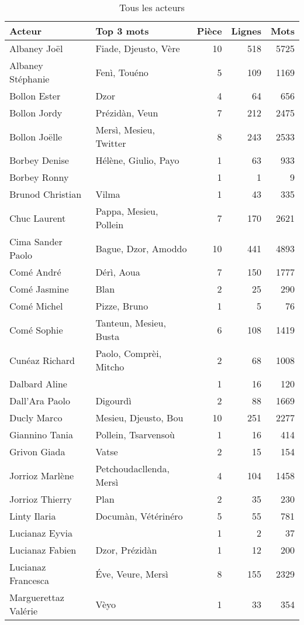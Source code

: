 \begin{longtable}{llrrr}
\caption{Tous les acteurs}\\
\toprule
\textbf{Acteur} & \textbf{Top 3 mots} & \textbf{Pièce} & \textbf{Lignes} & \textbf{Mots} \\
    \hline
Albaney Joël &Fiade, Djeusto, Vère & 10 & 518 & 5725\\
Albaney Stéphanie &Fenì, Touéno & 5 & 109 & 1169\\
Bollon Ester &Dzor & 4 & 64 & 656\\
Bollon Jordy &Prézidàn, Veun & 7 & 212 & 2475\\
Bollon Joëlle &Mersì, Mesieu, Twitter & 8 & 243 & 2533\\
Borbey Denise &Hélène, Giulio, Payo & 1 & 63 & 933\\
Borbey Ronny & & 1 & 1 & 9\\
Brunod Christian &Vilma & 1 & 43 & 335\\
Chuc Laurent &Pappa, Mesieu, Pollein & 7 & 170 & 2621\\
Cima Sander Paolo &Bague, Dzor, Amoddo & 10 & 441 & 4893\\
Comé André &Dérì, Aoua & 7 & 150 & 1777\\
Comé Jasmine &Blan & 2 & 25 & 290\\
Comé Michel &Pizze, Bruno & 1 & 5 & 76\\
Comé Sophie &Tanteun, Mesieu, Busta & 6 & 108 & 1419\\
Cunéaz Richard &Paolo, Comprèi, Mitcho & 2 & 68 & 1008\\
Dalbard Aline & & 1 & 16 & 120\\
Dall'Ara Paolo &Digourdì & 2 & 88 & 1669\\
Ducly Marco &Mesieu, Djeusto, Bou & 10 & 251 & 2277\\
Giannino Tania &Pollein, Tsarvensoù & 1 & 16 & 414\\
Grivon Giada &Vatse & 2 & 15 & 154\\
Jorrioz Marlène &Petchoudacllenda, Mersì & 4 & 104 & 1458\\
Jorrioz Thierry &Plan & 2 & 35 & 230\\
Linty Ilaria &Documàn, Vétérinéro & 5 & 55 & 781\\
Lucianaz Eyvia & & 1 & 2 & 37\\
Lucianaz Fabien &Dzor, Prézidàn & 1 & 12 & 200\\
Lucianaz Francesca &Éve, Veure, Mersì & 8 & 155 & 2329\\
Marguerettaz Valérie &Vèyo & 1 & 33 & 354\\

\end{longtable}
